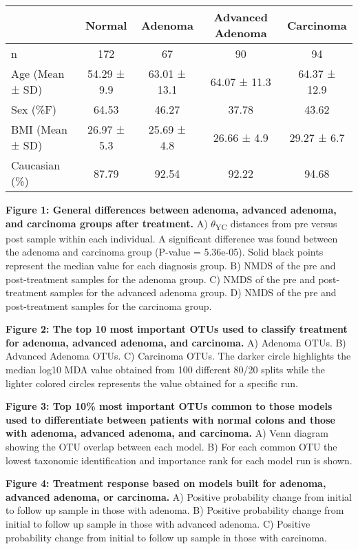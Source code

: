 \documentclass[12pt,]{article}
\begin{document}
\begin{longtable}[]{@{}lcccc@{}}
\toprule
& Normal & Adenoma & Advanced Adenoma & Carcinoma\tabularnewline
\midrule
\endhead
n & 172 & 67 & 90 & 94\tabularnewline
Age (Mean ± SD) & 54.29 ± 9.9 & 63.01 ± 13.1 & 64.07 ± 11.3 & 64.37 ±
12.9\tabularnewline
Sex (\%F) & 64.53 & 46.27 & 37.78 & 43.62\tabularnewline
BMI (Mean ± SD) & 26.97 ± 5.3 & 25.69 ± 4.8 & 26.66 ± 4.9 & 29.27 ±
6.7\tabularnewline
Caucasian (\%) & 87.79 & 92.54 & 92.22 & 94.68\tabularnewline
\bottomrule
\end{longtable}

\newpage

\textbf{Figure 1: General differences between adenoma, advanced adenoma,
and carcinoma groups after treatment.} A) \(\theta\)\textsubscript{YC}
distances from pre versus post sample within each individual. A
significant difference was found between the adenoma and carcinoma group
(P-value = 5.36e-05). Solid black points represent the median value for
each diagnosis group. B) NMDS of the pre and post-treatment samples for
the adenoma group. C) NMDS of the pre and post-treatment samples for the
advanced adenoma group. D) NMDS of the pre and post-treatment samples
for the carcinoma group.

\textbf{Figure 2: The top 10 most important OTUs used to classify
treatment for adenoma, advanced adenoma, and carcinoma.} A) Adenoma
OTUs. B) Advanced Adenoma OTUs. C) Carcinoma OTUs. The darker circle
highlights the median log10 MDA value obtained from 100 different 80/20
splits while the lighter colored circles represents the value obtained
for a specific run.

\textbf{Figure 3: Top 10\% most important OTUs common to those models
used to differentiate between patients with normal colons and those with
adenoma, advanced adenoma, and carcinoma.} A) Venn diagram showing the
OTU overlap between each model. B) For each common OTU the lowest
taxonomic identification and importance rank for each model run is
shown.

\textbf{Figure 4: Treatment response based on models built for adenoma,
advanced adenoma, or carcinoma.} A) Positive probability change from
initial to follow up sample in those with adenoma. B) Positive
probability change from initial to follow up sample in those with
advanced adenoma. C) Positive probability change from initial to follow
up sample in those with carcinoma.

\newpage
\end{document}
